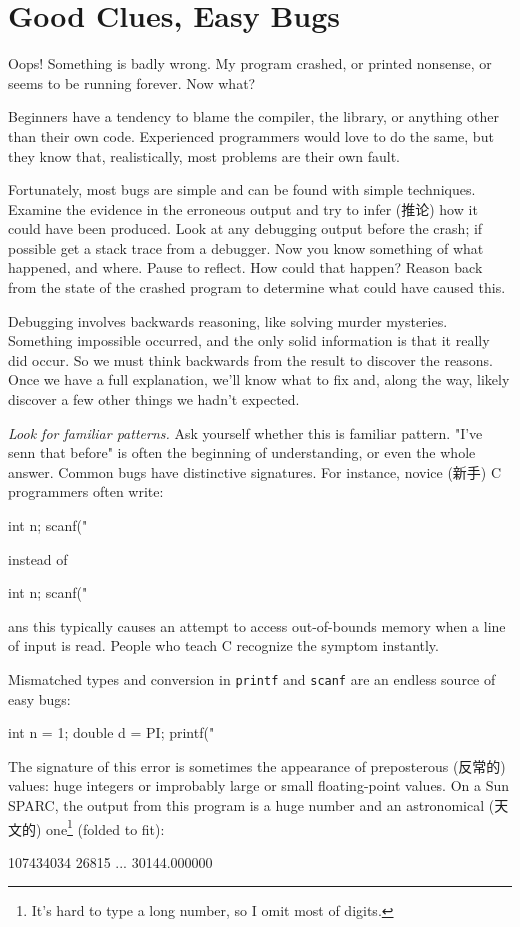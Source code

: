 \section{Good Clues, Easy Bugs}
Oops! Something is badly wrong. My program crashed, or printed nonsense, or
seems to be running forever. Now what?

Beginners have a tendency to blame the compiler, the library, or anything
other than their own code. Experienced programmers would love to do the
same, but they know that, realistically, most problems are their own fault.

Fortunately, most bugs are simple and can be found with simple techniques.
Examine the evidence in the erroneous output and try to infer (推论) how it
could have been produced. Look at any debugging output before the crash; if
possible get a stack trace from a debugger. Now you know something of what
happened, and where. Pause to reflect. How could that happen? Reason back
from the state of the crashed program to determine what could have caused
this.

Debugging involves backwards reasoning, like solving murder mysteries.
Something impossible occurred, and the only solid information is that it
really did occur. So we must think backwards from the result to discover
the reasons. Once we have a full explanation, we'll know what to fix and,
along the way, likely discover a few other things we hadn't expected.

\emph{Look for familiar patterns.} Ask yourself whether this is familiar
pattern. "I've senn that before" is often the beginning of understanding,
or even the whole answer. Common bugs have distinctive signatures. For
instance, novice (新手) C programmers often write:
\begin{badcode}
    int n;
    scanf("%
\end{badcode}
instead of 
\begin{wellcode}
    int n;
    scanf("%
\end{wellcode}
ans this typically causes an attempt to access out-of-bounds memory when a
line of input is read. People who teach C recognize the symptom instantly.

Mismatched types and conversion in \verb'printf' and \verb'scanf' are an
endless source of easy bugs:
\begin{badcode}
    int n = 1;
    double d = PI;
    printf("%
\end{badcode}
The signature of this error is sometimes the appearance of preposterous
(反常的) values: huge integers or improbably large or small floating-point
values. On a Sun SPARC, the output from this program is a huge number and
an astronomical (天文的) one\footnote{It's hard to type a long number, so I
    omit most of digits.} (folded to fit):
\begin{wellcode}
    107434034 26815 ... 30144.000000
\end{wellcode}

